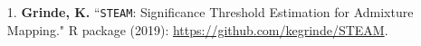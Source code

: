 \documentclass[margin]{res}
\begin{document}
\begin{resume}
\begin{itemize}
\item[1.] \textbf{Grinde, K.} ``\texttt{STEAM}: Significance Threshold Estimation for Admixture Mapping." R package (2019): \href{https://github.com/kegrinde/STEAM}{https://github.com/kegrinde/STEAM}.\\
	
\end{itemize}






    
 

\end{resume}
\end{document}
